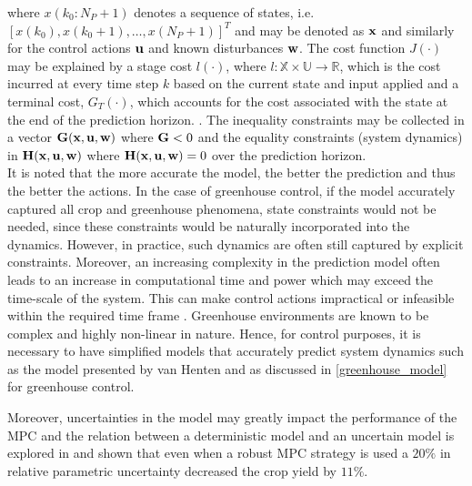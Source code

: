 where $x(k_0:N_P+1)$ denotes a sequence of states, i.e. $[x(k_0), x(k_0+1), \hdots, x(N_P+1)]^T$ and may be denoted as $\bold{x}$ and similarly for the control actions $\bold{u}$ and known disturbances $\bold{w}$. The cost function $J(\cdot)$ may be explained by a stage cost $l(\cdot)$, where $l: \mathbb X \times \mathbb U \rightarrow \mathbb R$, which is the cost incurred at every time step $k$ based on the current state and input applied and a terminal cost, $G_T(\cdot)$, which accounts for the cost associated with the state at the end of the prediction horizon. \cite{daiDiscreteTimeModelPredictive2012,boersmaRobustSamplebasedModel2022}. The inequality constraints may be collected in a vector $\bold{G(\bold{x,u,w})}$ where $\bold{G} < 0$ and the equality constraints (system dynamics) in $\bold{H(\bold{x,u,w})}$ where $\bold{H(\bold{x,u,w})}=0$ over the prediction horizon.\\

It is noted that the more accurate the model, the better the prediction and thus the better the actions. In the case of greenhouse control, if the model accurately captured all crop and greenhouse phenomena, state constraints would not be needed, since these constraints would be naturally incorporated into the dynamics. However, in practice, such dynamics are often still captured by explicit constraints. Moreover, an increasing complexity in the prediction model often leads to an increase in computational time and power which may exceed the time-scale of the system. This can make control actions impractical or infeasible within the required time frame \cite{rawlingsModelPredictiveControl2017}. Greenhouse environments are known to be complex and highly non-linear in nature. Hence, for control purposes,  it is necessary to have simplified models that accurately predict system dynamics such as the model presented by van Henten \cite{hentenGreenhouseClimateManagement1994} and as discussed in \autoref{greenhouse_model} for greenhouse control. 

Moreover, uncertainties in the model may greatly impact the performance of the MPC and the relation between a deterministic model and an uncertain model is explored in \cite{boersmaRobustSamplebasedModel2022} and shown that even when a robust MPC strategy is used a $20\%$ in relative parametric uncertainty decreased the crop yield by $11\%$.

